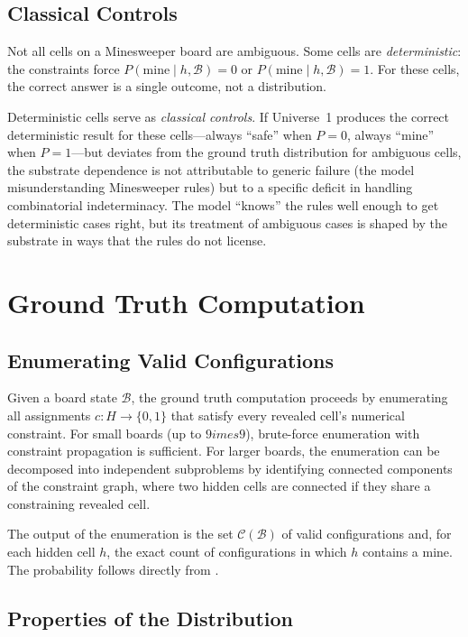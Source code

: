 \documentclass[12pt,a4paper]{article}
\begin{document}
\subsection{Classical Controls}
\label{sec:controls}

Not all cells on a Minesweeper board are ambiguous. Some cells are \emph{deterministic}: the constraints force $P(\text{mine} \mid h, \mathcal{B}) = 0$ or $P(\text{mine} \mid h, \mathcal{B}) = 1$. For these cells, the correct answer is a single outcome, not a distribution.

Deterministic cells serve as \emph{classical controls}. If Universe~1 produces the correct deterministic result for these cells---always ``safe'' when $P = 0$, always ``mine'' when $P = 1$---but deviates from the ground truth distribution for ambiguous cells, the substrate dependence is not attributable to generic failure (the model misunderstanding Minesweeper rules) but to a specific deficit in handling combinatorial indeterminacy. The model ``knows'' the rules well enough to get deterministic cases right, but its treatment of ambiguous cases is shaped by the substrate in ways that the rules do not license.

\section{Ground Truth Computation}
\label{sec:ground_truth}

\subsection{Enumerating Valid Configurations}
\label{sec:enumeration}

Given a board state $\mathcal{B}$, the ground truth computation proceeds by enumerating all assignments $c: H \to \{0,1\}$ that satisfy every revealed cell's numerical constraint. For small boards (up to $9 	imes 9$), brute-force enumeration with constraint propagation is sufficient. For larger boards, the enumeration can be decomposed into independent subproblems by identifying connected components of the constraint graph, where two hidden cells are connected if they share a constraining revealed cell.

The output of the enumeration is the set $\mathcal{C}(\mathcal{B})$ of valid configurations and, for each hidden cell $h$, the exact count of configurations in which $h$ contains a mine. The probability follows directly from .

\subsection{Properties of the Distribution}
\label{sec:distribution_properties}
\end{document}
